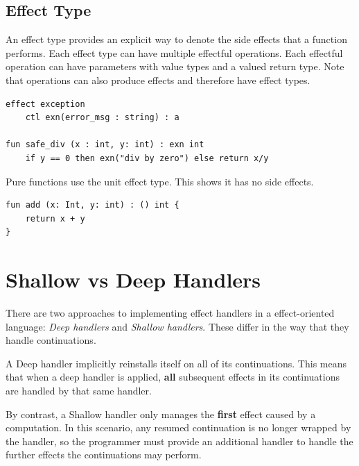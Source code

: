 \documentclass[logo,bsc,singlespacing,parskip]{infthesis}
\begin{document}




\subsection{Effect Type}
An effect type provides an explicit way to denote the side effects that a function performs. Each effect type can have multiple effectful operations. Each effectful operation can have parameters with value types and a valued return type. Note that operations can also produce effects and therefore have effect types.

\begin{lstlisting}
effect exception
    ctl exn(error_msg : string) : a 

fun safe_div (x : int, y: int) : exn int
    if y == 0 then exn("div by zero") else return x/y
\end{lstlisting}

Pure functions use the unit effect type. This shows it has no side effects. 

\begin{lstlisting}
fun add (x: Int, y: int) : () int {
	return x + y
}
\end{lstlisting}

\section{Shallow vs Deep Handlers}
There are two approaches to implementing effect handlers in a effect-oriented language: \textit{Deep handlers} and \textit{Shallow handlers}. These differ in the way that they handle continuations.

A Deep handler \cite{hillerstrom_foundations_nodate}  implicitly reinstalls itself on all of its continuations. This means that when a deep handler is applied, \textbf{all} subsequent effects in its continuations are handled by that same handler. 

By contrast, a Shallow handler \cite{ryu_shallow_2018} only manages the \textbf{first} effect caused by a computation. In this scenario, any resumed continuation is no longer wrapped by the handler, so the programmer must provide an additional handler to handle the further effects the continuations may perform.
\end{document}
